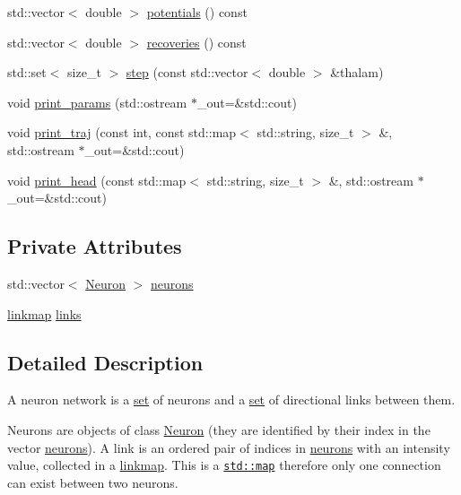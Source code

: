 \begin{DoxyCompactItemize}
\item 
std\+::vector$<$ double $>$ \hyperlink{classNetwork_a44d9c341bfec26cb37efe3c29fd7a103}{potentials} () const
\item 
std\+::vector$<$ double $>$ \hyperlink{classNetwork_a2e9dbb815c622cccdd50186ae8c9f4a7}{recoveries} () const
\item 
std\+::set$<$ size\+\_\+t $>$ \hyperlink{classNetwork_a4614f267a2238b8a10dfea23b54defac}{step} (const std\+::vector$<$ double $>$ \&thalam)
\item 
void \hyperlink{classNetwork_afc43116eb2429aeec0f3c6a54d252142}{print\+\_\+params} (std\+::ostream $\ast$\+\_\+out=\&std\+::cout)
\item 
void \hyperlink{classNetwork_ae460d31557bba058fdf66e4fe5feb801}{print\+\_\+traj} (const int, const std\+::map$<$ std\+::string, size\+\_\+t $>$ \&, std\+::ostream $\ast$\+\_\+out=\&std\+::cout)
\item 
void \hyperlink{classNetwork_ab572dd33cb91d9f0aae89c4477809d26}{print\+\_\+head} (const std\+::map$<$ std\+::string, size\+\_\+t $>$ \&, std\+::ostream $\ast$\+\_\+out=\&std\+::cout)
\end{DoxyCompactItemize}
\subsection*{Private Attributes}
\begin{DoxyCompactItemize}
\item 
std\+::vector$<$ \hyperlink{classNeuron}{Neuron} $>$ \hyperlink{classNetwork_a1b7832bc2c7b8855cdc3b2d6329eff9d}{neurons}
\item 
\hyperlink{network_8h_a889f48bcec09c9d72a03648e911c5ff5}{linkmap} \hyperlink{classNetwork_aef1609a9a6b865651417ce995b4575a8}{links}
\end{DoxyCompactItemize}


\subsection{Detailed Description}
A neuron network is a \hyperlink{classNetwork_a1b7832bc2c7b8855cdc3b2d6329eff9d}{set} of neurons and a \hyperlink{classNetwork_aef1609a9a6b865651417ce995b4575a8}{set} of directional links between them.

Neurons are objects of class \hyperlink{classNeuron}{Neuron} (they are identified by their index in the vector \hyperlink{classNetwork_a1b7832bc2c7b8855cdc3b2d6329eff9d}{neurons}). A link is an ordered pair of indices in \hyperlink{classNetwork_a1b7832bc2c7b8855cdc3b2d6329eff9d}{neurons} with an intensity value, collected in a \hyperlink{network_8h_a889f48bcec09c9d72a03648e911c5ff5}{linkmap}. This is a \href{https://en.cppreference.com/w/cpp/container/map}{\tt std\+::map} therefore only one connection can exist between two neurons.

